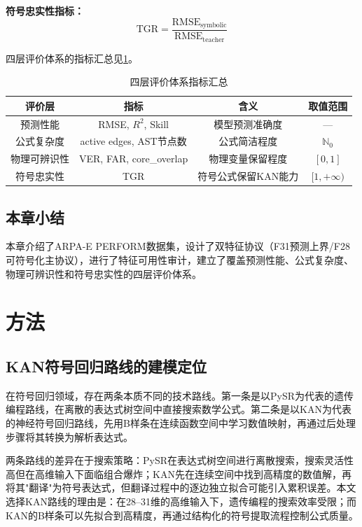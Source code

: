 \documentclass[12pt,a4paper,oneside]{ctexbook}
\newcommand{\TGR}{\text{TGR}}
\newcommand{\RMSE}{\text{RMSE}}
\begin{document}
\textbf{符号忠实性指标：}
\begin{equation}
\TGR = \frac{\RMSE_{\text{symbolic}}}{\RMSE_{\text{teacher}}}
\end{equation}

四层评价体系的指标汇总见\cref{tab:metrics}。

\begin{table}[htbp]
\centering
\caption{四层评价体系指标汇总}
\label{tab:metrics}
\begin{tabular}{cccc}
\toprule
评价层 & 指标 & 含义 & 取值范围 \\
\midrule
预测性能 & RMSE, $R^2$, Skill & 模型预测准确度 & — \\
公式复杂度 & active edges, AST节点数 & 公式简洁程度 & $\mathbb{N}_0$ \\
物理可辨识性 & VER, FAR, core\_overlap & 物理变量保留程度 & $[0,1]$ \\
符号忠实性 & TGR & 符号公式保留KAN能力 & $[1,+\infty)$ \\
\bottomrule
\end{tabular}
\end{table}

\section{本章小结}

本章介绍了ARPA-E PERFORM数据集，设计了双特征协议（F31预测上界/F28可符号化主协议），进行了特征可用性审计，建立了覆盖预测性能、公式复杂度、物理可辨识性和符号忠实性的四层评价体系。


\chapter{方法}

\section{KAN符号回归路线的建模定位}

在符号回归领域，存在两条本质不同的技术路线。第一条是以PySR\cite{cranmer2023pysr}为代表的遗传编程路线，在离散的表达式树空间中直接搜索数学公式。第二条是以KAN\cite{liu2025kan}为代表的神经符号回归路线，先用B样条在连续函数空间中学习数值映射，再通过后处理步骤将其转换为解析表达式。

两条路线的差异在于搜索策略：PySR在表达式树空间进行离散搜索，搜索灵活性高但在高维输入下面临组合爆炸；KAN先在连续空间中找到高精度的数值解，再将其"翻译"为符号表达式，但翻译过程中的逐边独立拟合可能引入累积误差\cite{sovrano2026incontext}。本文选择KAN路线的理由是：在28--31维的高维输入下，遗传编程的搜索效率受限；而KAN的B样条可以先拟合到高精度，再通过结构化的符号提取流程控制公式质量。
\end{document}
